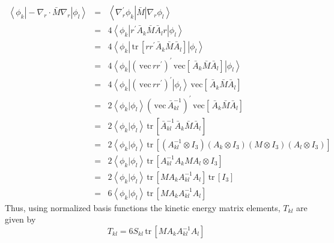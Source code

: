 \documentclass[12pt,thmsa,suthesis,verbatim]{report}
\begin{document}
\begin{eqnarray}
\left\langle \phi _k\right| -\nabla _r\cdot \bar M\nabla _r\left| \phi
_l\right\rangle &=&\left\langle \nabla _r^{\prime }\phi _k\right| \bar
M\left| \nabla _r\phi _l\right\rangle  \nonumber \\
\ &=&4\left\langle \phi _k\right| r^{\prime }\bar A_k\bar M\bar A_lr\left|
\phi _l\right\rangle  \nonumber \\
\ &=&4\left\langle \phi _k\right| \,\mathrm{tr}\,\left[ rr^{\prime }\bar
A_k\bar M\bar A_l\right] \left| \phi _l\right\rangle  \nonumber \\
\ &=&4\left\langle \phi _k\right| \left( \,\mathrm{vec}\,rr^{\prime }\right)
^{\prime }\,\mathrm{vec}\left[ \,\bar A_k\bar M\bar A_l\right] \left| \phi
_l\right\rangle  \nonumber \\
\ &=&4\left\langle \phi _k\right| \left( \,\mathrm{vec}\,rr^{\prime }\right)
^{\prime }\left| \phi _l\right\rangle \,\mathrm{vec}\left[ \,\bar A_k\bar
M\bar A_l\right]  \nonumber \\
\ &=&2\left\langle \phi _k\right. |\left. \phi _l\right\rangle \left( \,%
\mathrm{vec}\,\bar A_{kl}^{-1}\right) ^{\prime }\,\mathrm{vec}\left[ \,\bar
A_k\bar M\bar A_l\right]  \nonumber \\
\ &=&2\left\langle \phi _k\right. |\left. \phi _l\right\rangle \,\mathrm{tr}%
\,\left[ \bar A_{kl}^{-1}\bar A_k\bar M\bar A_l\right]  \nonumber \\
\ &=&2\left\langle \phi _k\right. |\left. \phi _l\right\rangle \,\mathrm{tr}%
\,\left[ \left( A_{kl}^{-1}\otimes I_3\right) \left( A_k\otimes I_3\right)
\left( M\otimes I_3\right) \left( A_l\otimes I_3\right) \right]  \nonumber \\
\ &=&2\left\langle \phi _k\right. |\left. \phi _l\right\rangle \,\mathrm{tr}%
\,\left[ A_{kl}^{-1}A_kMA_l\otimes I_3\right]  \nonumber \\
\ &=&2\left\langle \phi _k\right. |\left. \phi _l\right\rangle \,\mathrm{tr}%
\,\left[ MA_kA_{kl}^{-1}A_l\right] \,\mathrm{tr}\,\left[ I_3\right] 
\nonumber \\
\ &=&6\left\langle \phi _k\right. |\left. \phi _l\right\rangle \,\mathrm{tr}%
\,\left[ MA_kA_{kl}^{-1}A_l\right]
\end{eqnarray}
Thus, using normalized basis functions the kinetic energy matrix elements, $%
T_{kl}$ are given by 
\begin{equation}
T_{kl}=6S_{kl}\,\mathrm{tr}\,\left[ MA_kA_{kl}^{-1}A_l\right]  \label{Tkl}
\end{equation}
\end{document}
